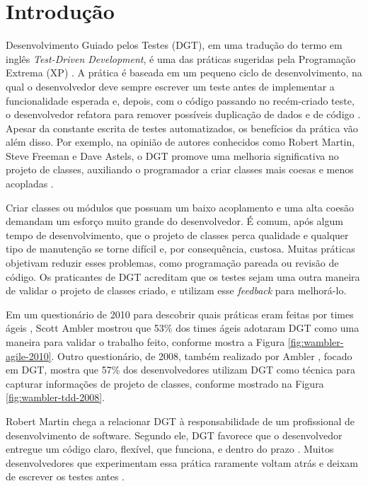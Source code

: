 \chapter{Introdução}
\label{cap:introducao}

Desenvolvimento Guiado pelos Testes (DGT), em uma tradução do termo
em inglês \textit{Test-Driven Development},
é uma das práticas sugeridas pela Programação
Extrema (XP) \cite{XPExplained}. A prática é baseada em um pequeno ciclo de
desenvolvimento, na qual o desenvolvedor deve sempre escrever um teste antes
de implementar a funcionalidade esperada e, depois, com o código
passando no recém-criado teste, o desenvolvedor refatora para 
remover possíveis duplicação de dados e de código \cite{TDDByExample}.
Apesar da constante escrita de testes automatizados, os benefícios da
prática vão além disso. Por exemplo, na opinião de autores conhecidos como Robert Martin,
Steve Freeman e Dave Astels, o DGT promove
uma melhoria significativa no projeto de classes, auxiliando o programador a
criar classes mais coesas e menos acopladas \cite{TDDByExample} \cite{GOOS} 
\cite{astels-tdd}.

Criar classes ou módulos que possuam um baixo
acoplamento e uma alta coesão demandam um esforço muito grande do desenvolvedor. 
É comum, após algum tempo de desenvolvimento, que o projeto de classes perca qualidade
e qualquer tipo de manutenção se torne difícil e, por consequência, custosa.
Muitas práticas objetivam reduzir esses problemas, como programação pareada ou
revisão de código. Os praticantes de DGT acreditam que os testes sejam uma outra
maneira de validar o projeto de classes criado, e utilizam esse \textit{feedback} para melhorá-lo.

Em um questionário de 2010 para descobrir quais práticas eram feitas por times
ágeis \cite{wambler-survey-agile}, Scott Ambler mostrou que 53\% dos times ágeis
adotaram DGT como uma maneira para validar o trabalho feito, conforme mostra a 
Figura \ref{fig:wambler-agile-2010}. Outro questionário, de 2008, também realizado por Ambler
\cite{wambler-survey-tdd}, focado em DGT, mostra que 57\% dos desenvolvedores 
utilizam DGT como técnica para capturar informações de projeto de classes, conforme mostrado
na Figura \ref{fig:wambler-tdd-2008}.

Robert Martin chega a relacionar DGT à responsabilidade de um 
profissional de desenvolvimento de software. 
Segundo ele, DGT favorece que o desenvolvedor entregue um 
código claro, flexível, que funciona, e dentro do prazo \cite{martin-profissionalismo}.
Muitos desenvolvedores que experimentam essa prática raramente voltam atrás e deixam
de escrever os testes antes \cite{tdd-fearless}. 

